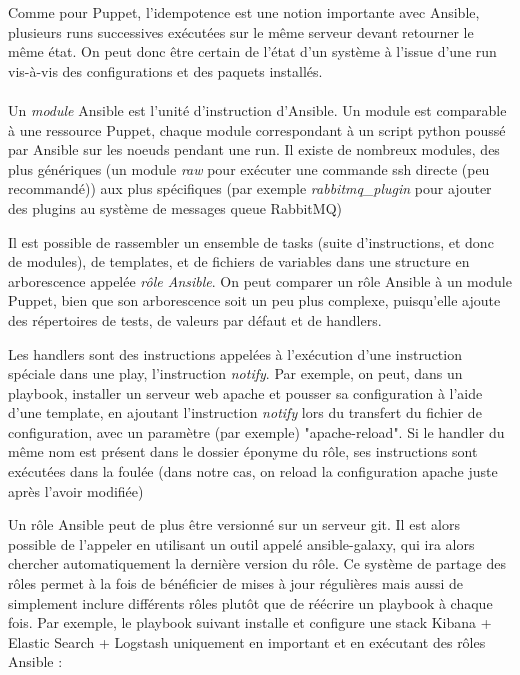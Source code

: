 \documentclass[14 pt]{extreport}
\begin{document}
Comme pour Puppet, l'idempotence est une notion importante avec Ansible, plusieurs runs successives exécutées sur le même serveur devant retourner le même état. On peut donc être certain de l'état d'un système à l'issue d'une run vis-à-vis des configurations et des paquets installés.

\paragraph*{}Un \emph{module} Ansible est l'unité d'instruction d'Ansible. Un module est comparable à une ressource Puppet, chaque module correspondant à un script python poussé par Ansible sur les noeuds pendant une run. Il existe de nombreux modules, des plus génériques (un module \emph{raw} pour exécuter une commande ssh directe (peu recommandé)) aux plus spécifiques (par exemple \emph{rabbitmq\_plugin} pour ajouter des plugins au système de messages queue RabbitMQ)

Il est possible de rassembler un ensemble de tasks (suite d'instructions, et donc de modules), de templates, et de fichiers de variables dans une structure en arborescence appelée \emph{rôle Ansible}. On peut comparer un rôle Ansible à un module Puppet, bien que son arborescence soit un peu plus complexe, puisqu'elle ajoute des répertoires de tests, de valeurs par défaut et de handlers.

Les handlers sont des instructions appelées à l'exécution d'une instruction spéciale dans une play, l'instruction \emph{notify}. Par exemple, on peut, dans un playbook, installer un serveur web apache et pousser sa configuration à l'aide d'une template, en ajoutant l'instruction \emph{notify} lors du transfert du fichier de configuration, avec un paramètre (par exemple) "apache-reload". Si le handler du même nom est présent dans le dossier éponyme du rôle, ses instructions sont exécutées dans la foulée (dans notre cas, on reload la configuration apache juste après l'avoir modifiée)

Un rôle Ansible peut de plus être versionné sur un serveur git. Il est alors possible de l'appeler en utilisant un outil appelé ansible-galaxy, qui ira alors chercher automatiquement la dernière version du rôle. Ce système de partage des rôles permet à la fois de bénéficier de mises à jour régulières mais aussi de simplement inclure différents rôles plutôt que de réécrire un playbook à chaque fois. Par exemple, le playbook suivant installe et configure une stack Kibana + Elastic Search + Logstash uniquement en important et en exécutant des rôles Ansible :
\end{document}
